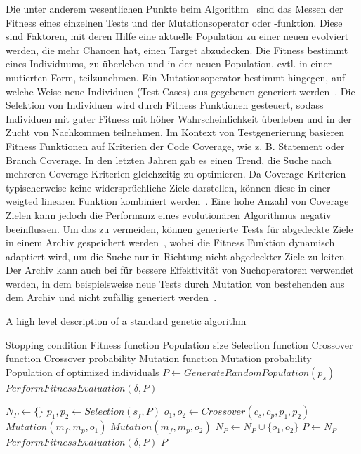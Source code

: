 \documentclass{article}
\newcommand{\Desc}[2]{\State \makebox[2em][l]{#1}#2}
\begin{document}
Die unter anderem wesentlichen Punkte beim Algorithm~ sind das Messen der Fitness eines einzelnen Tests und der Mutationsoperator oder -funktion. Diese sind Faktoren, mit deren Hilfe eine aktuelle Population zu einer neuen evolviert werden, die mehr Chancen hat, einen Target abzudecken. Die Fitness bestimmt eines Individuums, zu überleben und in der neuen Population, evtl. in einer mutierten Form, teilzunehmen. Ein Mutationsoperator bestimmt hingegen, auf welche Weise neue Individuen (Test Cases) aus gegebenen generiert werden~\cite{Tonella2004}. Die Selektion von Individuen wird durch Fitness Funktionen gesteuert, sodass Individuen mit guter Fitness mit höher Wahrscheinlichkeit überleben und in der Zucht von Nachkommen teilnehmen. Im Kontext von Testgenerierung basieren Fitness Funktionen auf Kriterien der Code Coverage, wie z. B. Statement oder Branch Coverage. In den letzten Jahren gab es einen Trend, die Suche nach mehreren Coverage Kriterien gleichzeitig zu optimieren. Da Coverage Kriterien typischerweise keine widersprüchliche Ziele darstellen, können diese in einer weigted linearen Funktion kombiniert werden~\cite{Rojas2015}. Eine hohe Anzahl von Coverage Zielen kann jedoch die Performanz eines evolutionären Algorithmus negativ beeinflussen. Um das zu vermeiden, können generierte Tests für abgedeckte Ziele in einem Archiv gespeichert werden~\cite{Rojas2017}, wobei die Fitness Funktion dynamisch adaptiert wird, um die Suche nur in Richtung nicht abgedeckter Ziele zu leiten. Der Archiv kann auch bei für bessere Effektivität von Suchoperatoren verwendet werden, in dem beispielsweise neue Tests durch Mutation von bestehenden aus dem Archiv und nicht zufällig generiert werden~\cite{Campos2017}. 
\begin{algorithm}
\caption{A high level description of a standard genetic algorithm~\cite{Campos2017}}\label{alg:genetic-algorithm}
\begin{algorithmic}
\Input
  \Desc{$C$}{Stopping condition}
  \Desc{$\delta$}{Fitness function}
  \Desc{$p_s$}{Population size}
  \Desc{$s_f$}{Selection function}
  \Desc{$c_f$}{Crossover function}
  \Desc{$c_p$}{Crossover probability}
  \Desc{$m_f$}{Mutation function}
  \Desc{$m_p$}{Mutation probability}
  \EndInput
  \Output
  \Desc{$P$}{Population of optimized individuals}
  \EndOutput
\State $P \gets GenerateRandomPopulation(p_s)$
\State $PerformFitnessEvaluation(\delta, P)$

    \State $N_P \gets \{\}$
        \State $p_1, p_2 \gets Selection(s_f, P)$
        \State $o_1, o_2 \gets Crossover(c_s, c_p, p_1, p_2)$
        \State $Mutation(m_f, m_p, o_1)$
        \State $Mutation(m_f, m_p, o_2)$
        \State $N_P \gets N_P \cup \{o_1, o_2\}$
    \EndWhile
    \State $P \gets N_P$
    \State $PerformFitnessEvaluation(\delta, P)$
\EndWhile
\State \Return $P$
\end{algorithmic}
\end{algorithm}
\end{document}
